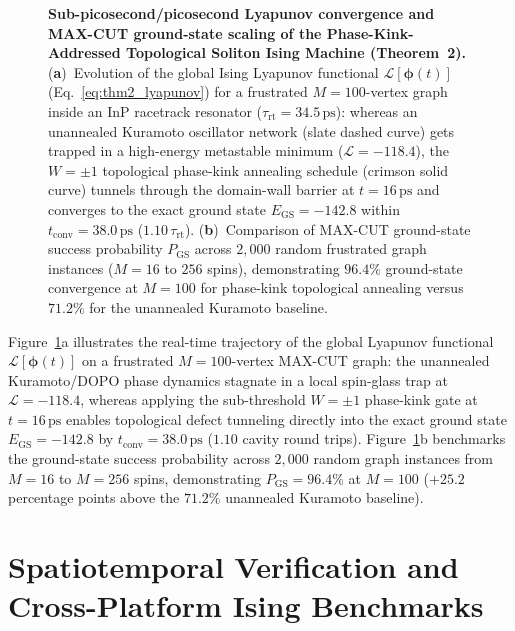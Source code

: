 \documentclass[11pt,letterpaper]{article}
\begin{document}
\begin{figure}[t!]
\centering
\resizebox{0.98\textwidth}{!}{}
\caption{\textbf{Sub-picosecond/picosecond Lyapunov convergence and MAX-CUT ground-state scaling of the Phase-Kink-Addressed Topological Soliton Ising Machine (Theorem~2).} (\textbf{a})~Evolution of the global Ising Lyapunov functional $\mathcal{L}[\bm{\phi}(t)]$ (Eq.~\eqref{eq:thm2_lyapunov}) for a frustrated $M = 100$-vertex graph inside an InP racetrack resonator ($\tau_{\mathrm{rt}} = 34.5\,\mathrm{ps}$): whereas an unannealed Kuramoto oscillator network (slate dashed curve) gets trapped in a high-energy metastable minimum ($\mathcal{L} = -118.4$), the $W = \pm 1$ topological phase-kink annealing schedule (crimson solid curve) tunnels through the domain-wall barrier at $t = 16\,\mathrm{ps}$ and converges to the exact ground state $E_{\mathrm{GS}} = -142.8$ within $t_{\mathrm{conv}} = 38.0\,\mathrm{ps}$ ($1.10\,\tau_{\mathrm{rt}}$). (\textbf{b})~Comparison of MAX-CUT ground-state success probability $P_{\mathrm{GS}}$ across $2{,}000$ random frustrated graph instances ($M = 16$ to $256$ spins), demonstrating $96.4\%$ ground-state convergence at $M = 100$ for phase-kink topological annealing versus $71.2\%$ for the unannealed Kuramoto baseline.}
\label{fig:thm2_ising}
\end{figure}

Figure~\ref{fig:thm2_ising}a illustrates the real-time trajectory of the global Lyapunov functional $\mathcal{L}[\bm{\phi}(t)]$ on a frustrated $M = 100$-vertex MAX-CUT graph: the unannealed Kuramoto/DOPO phase dynamics stagnate in a local spin-glass trap at $\mathcal{L} = -118.4$, whereas applying the sub-threshold $W = \pm 1$ phase-kink gate at $t = 16\,\mathrm{ps}$ enables topological defect tunneling directly into the exact ground state $E_{\mathrm{GS}} = -142.8$ by $t_{\mathrm{conv}} = 38.0\,\mathrm{ps}$ ($1.10$ cavity round trips). Figure~\ref{fig:thm2_ising}b benchmarks the ground-state success probability across $2{,}000$ random graph instances from $M = 16$ to $M = 256$ spins, demonstrating $P_{\mathrm{GS}} = 96.4\%$ at $M = 100$ ($+25.2$ percentage points above the $71.2\%$ unannealed Kuramoto baseline).

\section{Spatiotemporal Verification and Cross-Platform Ising Benchmarks}
\label{sec:benchmarks}
\end{document}
